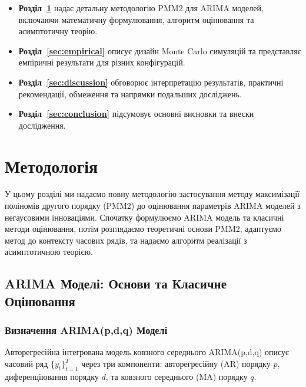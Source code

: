 \documentclass[12pt,a4paper]{article}
\begin{document}
\begin{itemize}
    \item \textbf{Розділ~\ref{sec:methodology}} надає детальну методологію PMM2 для ARIMA моделей, включаючи математичну формулювання, алгоритм оцінювання та асимптотичну теорію.

    \item \textbf{Розділ~\ref{sec:empirical}} описує дизайн Monte Carlo симуляцій та представляє емпіричні результати для різних конфігурацій.

    \item \textbf{Розділ~\ref{sec:discussion}} обговорює інтерпретацію результатів, практичні рекомендації, обмеження та напрямки подальших досліджень.

    \item \textbf{Розділ~\ref{sec:conclusion}} підсумовує основні висновки та внески дослідження.
\end{itemize}

\section{Методологія}
\label{sec:methodology}

У цьому розділі ми надаємо повну методологію застосування методу максимізації поліномів другого порядку (PMM2) до оцінювання параметрів ARIMA моделей з негаусовими інноваціями. Спочатку формулюємо ARIMA модель та класичні методи оцінювання, потім розглядаємо теоретичні основи PMM2, адаптуємо метод до контексту часових рядів, та надаємо алгоритм реалізації з асимптотичною теорією.

\subsection{ARIMA Моделі: Основи та Класичне Оцінювання}
\label{subsec:arima_basics}

\subsubsection{Визначення ARIMA(p,d,q) Моделі}

Авторегресійна інтегрована модель ковзного середнього ARIMA(p,d,q) описує часовий ряд $\{y_t\}_{t=1}^T$ через три компоненти: авторегресійну (AR) порядку $p$, диференціювання порядку $d$, та ковзного середнього (MA) порядку $q$.
\end{document}
